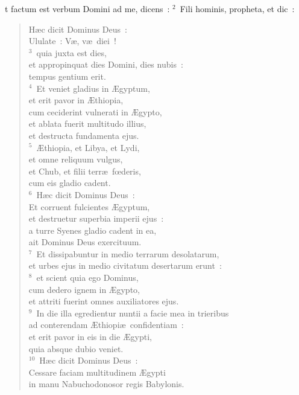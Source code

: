 \bchapter
{}t factum est verbum Domini ad me, dicens~:
${}^{2}$~Fili hominis, propheta, et dic~: \begin{verse}H\ae c dicit Dominus Deus~:\\ Ululate~: V\ae , v\ae\ diei~!\\
${}^{3}$~quia juxta est dies,\\ et appropinquat dies Domini, dies nubis~:\\ tempus gentium erit.\\
${}^{4}$~Et veniet gladius in \AE gyptum,\\ et erit pavor in \AE thiopia,\\ cum ceciderint vulnerati in \AE gypto,\\ et ablata fuerit multitudo illius,\\ et destructa fundamenta ejus.\\
${}^{5}$~\AE thiopia, et Libya, et Lydi,\\ et omne reliquum vulgus,\\ et Chub, et filii terr\ae\ fœderis,\\ cum eis gladio cadent.\\
${}^{6}$~H\ae c dicit Dominus Deus~:\\ Et corruent fulcientes \AE gyptum,\\ et destruetur superbia imperii ejus~:\\ a turre Syenes gladio cadent in ea,\\ ait Dominus Deus exercituum.\\
${}^{7}$~Et dissipabuntur in medio terrarum desolatarum,\\ et urbes ejus in medio civitatum desertarum erunt~:\\
${}^{8}$~et scient quia ego Dominus,\\ cum dedero ignem in \AE gypto,\\ et attriti fuerint omnes auxiliatores ejus.\\
${}^{9}$~In die illa egredientur nuntii a facie mea in trieribus\\ ad conterendam \AE thiopi\ae\ confidentiam~:\\ et erit pavor in eis in die \AE gypti,\\ quia absque dubio veniet.\\
${}^{10}$~H\ae c dicit Dominus Deus~:\\ Cessare faciam multitudinem \AE gypti\\ in manu Nabuchodonosor regis Babylonis.\\

\end{verse}

